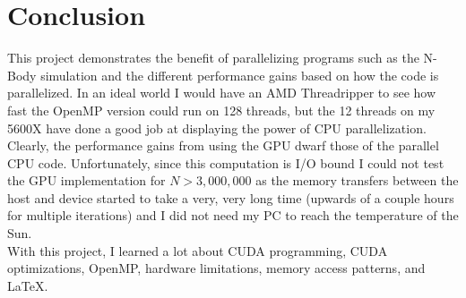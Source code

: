 \section{Conclusion}
This project demonstrates the benefit of parallelizing programs such as the N-Body simulation and the different performance gains based on how the code is parallelized. In an ideal world I would have an AMD Threadripper to see how fast the OpenMP version could run on 128 threads, but the 12 threads on my 5600X have done a good job at displaying the power of CPU parallelization. Clearly, the performance gains from using the GPU dwarf those of the parallel CPU code. Unfortunately, since this computation is I/O bound I could not test the GPU implementation for $N > 3,000,000$ as the memory transfers between the host and device started to take a very, very long time (upwards of a couple hours for multiple iterations) and I did not need my PC to reach the temperature of the Sun.\\
\indent With this project, I learned a lot about CUDA programming, CUDA optimizations, OpenMP, hardware limitations, memory access patterns, and \LaTeX. 

